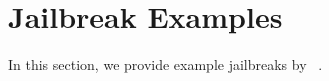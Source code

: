 



\section{Jailbreak Examples}\label{appendix:jailbreak-examples}
In this section, we provide example jailbreaks by \methodname~.

